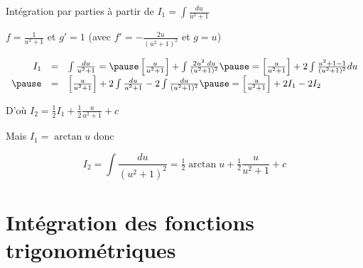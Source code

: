 \begin{frame}

\begin{exemple}[Calcul de $I_2 = \int \frac{du}{(u^2+1)^2}$]

\pause

Intégration par parties à partir de $I_1=\int \frac{du}{u^2+1}$


\pause 
$f=\frac{1}{u^2+1}$ et $g'=1$ 
\pause 
(avec $f'=-\frac{2u}{(u^2+1)^2}$ et $g=u$) 

\pause

$$\begin{array}{rcl}
I_1 
  & = & \int \frac{du}{u^2+1} =\pause \left[ \frac{u}{u^2+1} \right] + \int \frac{2u^2 \; du}{(u^2+1)^2}
        \pause = \left[ \frac{u}{u^2+1} \right] + 2 \int  \frac{u^2+1 - 1}{(u^2+1)^2}du \\
\pause
 & = & \left[ \frac{u}{u^2+1} \right] + 2 \int \frac{du}{u^2+1} - 2 \int \frac{du}{(u^2+1)^2}
    \pause = \left[ \frac{u}{u^2+1} \right] + 2I_1 - 2I_2  
\end{array}
$$

\pause
D'où $\displaystyle I_2 = \tfrac12 I_1 + \tfrac12\frac{u}{u^2+1} + c$

\pause
\medskip

Mais $I_1=\arctan u$ donc 

\pause

$$I_2 = \int \frac{du}{(u^2+1)^2} =  \tfrac12 \arctan u + \tfrac12\frac{u}{u^2+1} + c$$ 
\end{exemple}
\end{frame}





\section*{Intégration des fonctions trigonométriques}



